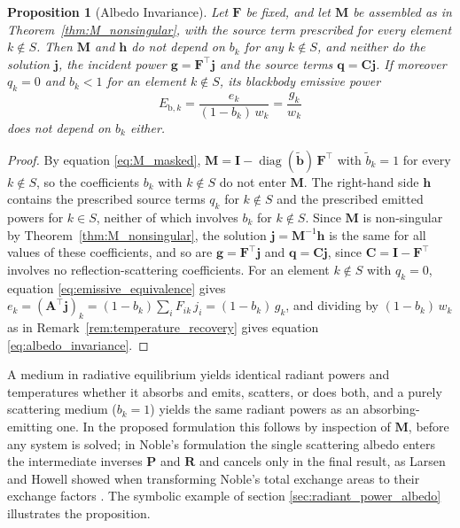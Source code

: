 \documentclass[preprint,1p,times]{elsarticle}
\theoremstyle{plain}
\newtheorem{proposition}[theorem]{Proposition}
\theoremstyle{definition}
\theoremstyle{remark}
\begin{document}
\begin{proposition}[Albedo Invariance]
\label{prop:albedo_invariance}
Let $\mathbf{F}$ be fixed, and let $\mathbf{M}$ be assembled as in Theorem~\ref{thm:M_nonsingular}, with the source term prescribed for every element $k \notin S$. Then $\mathbf{M}$ and $\mathbf{h}$ do not depend on $b_k$ for any $k \notin S$, and neither do the solution $\mathbf{j}$, the incident power $\mathbf{g} = \mathbf{F}^\top\mathbf{j}$ and the source terms $\mathbf{q} = \mathbf{C}\mathbf{j}$. If moreover $q_k = 0$ and $b_k < 1$ for an element $k \notin S$, its blackbody emissive power
\begin{equation}
E_{\mathrm{b},k} = \frac{e_k}{(1 - b_k)\, w_k} = \frac{g_k}{w_k}
\label{eq:albedo_invariance}
\end{equation}
does not depend on $b_k$ either.
\end{proposition}

\begin{proof}
By equation \eqref{eq:M_masked}, $\mathbf{M} = \mathbf{I} - \operatorname{diag}(\tilde{\mathbf{b}})\,\mathbf{F}^\top$ with $\tilde{b}_k = 1$ for every $k \notin S$, so the coefficients $b_k$ with $k \notin S$ do not enter $\mathbf{M}$. The right-hand side $\mathbf{h}$ contains the prescribed source terms $q_k$ for $k \notin S$ and the prescribed emitted powers for $k \in S$, neither of which involves $b_k$ for $k \notin S$. Since $\mathbf{M}$ is non-singular by Theorem~\ref{thm:M_nonsingular}, the solution $\mathbf{j} = \mathbf{M}^{-1}\mathbf{h}$ is the same for all values of these coefficients, and so are $\mathbf{g} = \mathbf{F}^\top\mathbf{j}$ and $\mathbf{q} = \mathbf{C}\mathbf{j}$, since $\mathbf{C} = \mathbf{I} - \mathbf{F}^\top$ involves no reflection-scattering coefficients. For an element $k \notin S$ with $q_k = 0$, equation \eqref{eq:emissive_equivalence} gives $e_k = (\mathbf{A}^\top\mathbf{j})_k = (1 - b_k) \sum_i F_{ik}\, j_i = (1 - b_k)\, g_k$, and dividing by $(1 - b_k)\, w_k$ as in Remark~\ref{rem:temperature_recovery} gives equation \eqref{eq:albedo_invariance}.
\end{proof}

A medium in radiative equilibrium yields identical radiant powers and temperatures whether it absorbs and emits, scatters, or does both, and a purely scattering medium ($b_k = 1$) yields the same radiant powers as an absorbing-emitting one. In the proposed formulation this follows by inspection of $\mathbf{M}$, before any system is solved; in Noble's formulation \citep{Noble1975} the single scattering albedo enters the intermediate inverses $\mathbf{P}$ and $\mathbf{R}$ and cancels only in the final result, as Larsen and Howell showed when transforming Noble's total exchange areas to their exchange factors \citep{LarsenHowell1985}. The symbolic example of section \ref{sec:radiant_power_albedo} illustrates the proposition.
\end{document}
